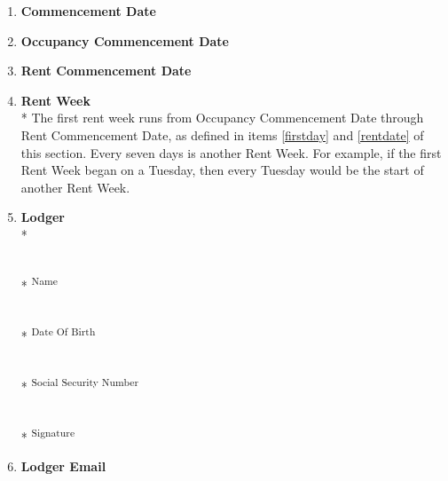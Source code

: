 \documentclass[12pt,letterpaper]{article}
\newcommand{\lodger}{Lodger}
\newcommand{\signdate}{Commencement Date}
\newcommand{\firstday}{Occupancy Commencement Date}
\newcommand{\rentdate}{Rent Commencement Date}
\newcommand{\rentweek}{Rent Week}
\newcommand{\lemail}{Lodger Email}
\begin{document}
\begin{multicols}{2}
\begin{enumerate}
			\item \textbf{\signdate{}} \label{signdate}

				\vspace{0.5cm}\makebox[2in]{\hrulefill}

			\item \textbf{\firstday{}} \label{firstday}

				\vspace{0.5cm}\makebox[2in]{\hrulefill}

			\item \textbf{\rentdate{}} \label{rentdate}
				
				\vspace{0.5cm}\makebox[2in]{\hrulefill}

			\item \textbf{\rentweek{}}\\* \label{rentweek}
				The first rent week runs from \firstday{} through \rentdate{}, as defined in items \ref{firstday} and \ref{rentdate} of this section.  Every seven days is another \rentweek{}. For example, if the first \rentweek{} began on a Tuesday, then every Tuesday would be the start of another \rentweek{}.
				
			\item \textbf{\lodger{}}\\* \label{lodger}
				\begin{minipage}[t]{2in}

					\vspace{0.2cm}\makebox[2in]{\hrulefill} \\*
					\textsuperscript{Name}
					
					\vspace{0.2cm}\makebox[2in]{\hrulefill} \\*
					\textsuperscript{Date Of Birth}
					
					\vspace{0.5cm}\makebox[2in]{\hrulefill} \\*
					\textsuperscript{Social Security Number}
					
					\vspace{0.5cm}\makebox[2in]{\hrulefill} \\*
					\textsuperscript{Signature}
				\end{minipage}%

			\item \textbf{\lemail{}} \label{lemail}

				\vspace{0.5cm}\makebox[2in]{\hrulefill}

				\vspace{0.5cm}\makebox[2in]{\hrulefill}
		\end{enumerate}
	\end{multicols}
	
\end{document}
